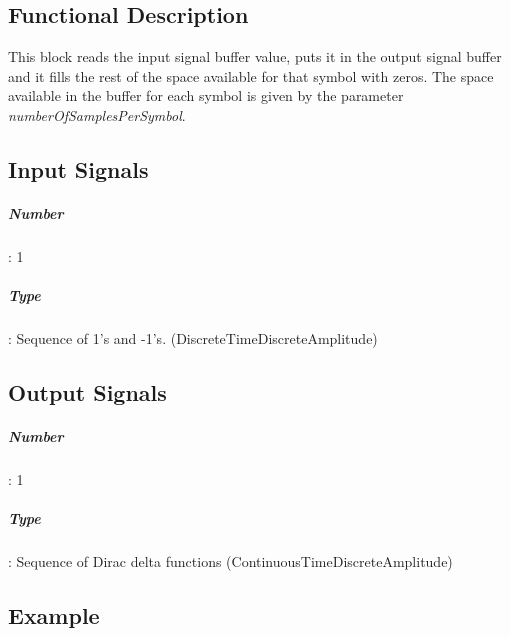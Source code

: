 \subsection*{Functional Description}

This block reads the input signal buffer value, puts it in the output signal buffer and it fills the rest of the space available for that symbol with zeros. The space available in the buffer for each symbol is given by the parameter \textit{numberOfSamplesPerSymbol}.

\subsection*{Input Signals}

\subparagraph*{Number}: 1

\subparagraph*{Type}: Sequence of 1's and -1's. (DiscreteTimeDiscreteAmplitude)

\subsection*{Output Signals}

\subparagraph*{Number}: 1

\subparagraph*{Type}: Sequence of Dirac delta functions (ContinuousTimeDiscreteAmplitude)

\subsection*{Example}

